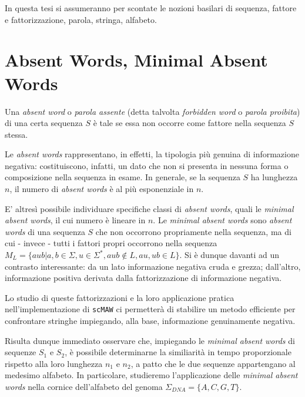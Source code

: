 In questa tesi si assumeranno per scontate le nozioni basilari di sequenza, fattore e fattorizzazione, parola, stringa, alfabeto.

\section{Absent Words, Minimal Absent Words}

Una \textit{absent word} o \textit{parola assente} (detta talvolta \textit{forbidden word} o \textit{parola proibita}) di una certa sequenza $S$ è tale se essa non occorre come fattore nella sequenza $S$ stessa. 

Le \textit{absent words} rappresentano, in effetti, la tipologia più genuina di informazione negativa: costituiscono, infatti, un dato che non si presenta in nessuna forma o composizione nella sequenza in esame. In generale, se la sequenza $S$ ha lunghezza $n$, il numero di \textit{absent words} è al più esponenziale in $n$. 

\vspace{3mm}

E' altresì possibile individuare specifiche classi di \textit{absent words}, quali le \textit{minimal absent words}, il cui numero è lineare in $n$. Le \textit{minimal absent words} sono \textit{absent words} di una sequenza $S$ che non occorrono propriamente nella sequenza, ma di cui - invece - tutti i fattori propri occorrono nella sequenza 
\(M_L = \{aub | a,b \in \Sigma, u\in \Sigma^*, aub\not\in L, au,ub\in L\} \). Si è dunque davanti ad un contrasto interessante: da un lato informazione negativa cruda e grezza; dall'altro, informazione positiva derivata dalla fattorizzazione di informazione negativa. 

\vspace{3mm}

Lo studio di queste fattorizzazioni e la loro applicazione pratica nell'implementazione di \verb|scMAW| ci permetterà di stabilire un metodo efficiente per confrontare stringhe impiegando, alla base, informazione genuinamente negativa.

\vspace{3mm}

Risulta dunque immediato osservare che, impiegando le \textit{minimal absent words} di sequenze $S_1$ e $S_2$, è possibile determinarne la similiarità in tempo proporzionale rispetto alla loro lunghezza $n_1$ e $n_2$, a patto che le due sequenze appartengano al medesimo alfabeto. In particolare, studieremo l'applicazione delle\textit{ minimal absent words} nella cornice dell'alfabeto del genoma $\Sigma_{DNA} =\{A, C, G, T\}$.

